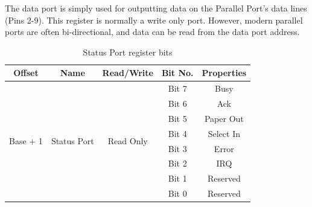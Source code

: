 \documentclass[a4paper,28pt,twoside,openright]{report}
\begin{document}
The data port is simply used for outputting data on the Parallel Port's data lines (Pins 2-9). This register is normally a write only port. However, modern parallel ports are often bi-directional, and data can be read from the data port address.

\begin{table}[h]
\centering
\bgroup
\def\arraystretch{1.5}
\begin{tabular}{|c|c|c|c|c|}
\hline
\textbf{Offset}           & \textbf{Name}                & \textbf{Read/Write}        & \textbf{Bit No.} & \textbf{Properties} \\ \hline
\multirow{8}{*}{Base + 1} & \multirow{8}{*}{Status Port} & \multirow{8}{*}{Read Only} & Bit 7            & Busy                \\ \cline{4-5} 
                          &                              &                            & Bit 6            & Ack                 \\ \cline{4-5} 
                          &                              &                            & Bit 5            & Paper Out           \\ \cline{4-5} 
                          &                              &                            & Bit 4            & Select In           \\ \cline{4-5} 
                          &                              &                            & Bit 3            & Error               \\ \cline{4-5} 
                          &                              &                            & Bit 2            & IRQ                 \\ \cline{4-5} 
                          &                              &                            & Bit 1            & Reserved            \\ \cline{4-5} 
                          &                              &                            & Bit 0            & Reserved              \\ \hline
\end{tabular}
\caption{Status Port register bits}
\egroup
\end{table}
\end{document}
